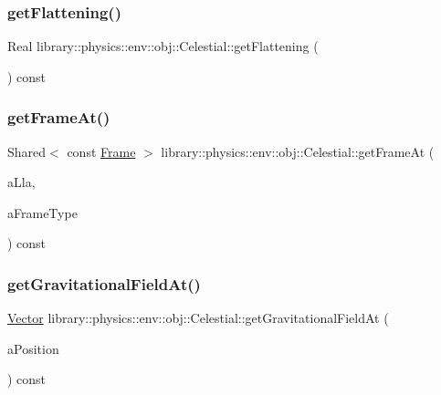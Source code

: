 \subsubsection{\texorpdfstring{get\+Flattening()}{getFlattening()}}
{\footnotesize\ttfamily Real library\+::physics\+::env\+::obj\+::\+Celestial\+::get\+Flattening (\begin{DoxyParamCaption}{ }\end{DoxyParamCaption}) const}

\mbox{\label{classlibrary_1_1physics_1_1env_1_1obj_1_1_celestial_ad1dfffd88b216eccf83a9441cae304be}} 
\subsubsection{\texorpdfstring{get\+Frame\+At()}{getFrameAt()}}
{\footnotesize\ttfamily Shared$<$ const \hyperlink{classlibrary_1_1physics_1_1coord_1_1_frame}{Frame} $>$ library\+::physics\+::env\+::obj\+::\+Celestial\+::get\+Frame\+At (\begin{DoxyParamCaption}\item[{const \hyperlink{classlibrary_1_1physics_1_1coord_1_1spherical_1_1_l_l_a}{L\+LA} \&}]{a\+Lla,  }\item[{const \hyperlink{classlibrary_1_1physics_1_1env_1_1obj_1_1_celestial_a8585fb32125cb6c73ae1339a5ea09c79}{Celestial\+::\+Frame\+Type} \&}]{a\+Frame\+Type }\end{DoxyParamCaption}) const}

\mbox{\label{classlibrary_1_1physics_1_1env_1_1obj_1_1_celestial_aa6313086a85ad19128d16f376a32aefe}} 
\subsubsection{\texorpdfstring{get\+Gravitational\+Field\+At()}{getGravitationalFieldAt()}}
{\footnotesize\ttfamily \hyperlink{classlibrary_1_1physics_1_1data_1_1_vector}{Vector} library\+::physics\+::env\+::obj\+::\+Celestial\+::get\+Gravitational\+Field\+At (\begin{DoxyParamCaption}\item[{const \hyperlink{classlibrary_1_1physics_1_1coord_1_1_position}{Position} \&}]{a\+Position }\end{DoxyParamCaption}) const}

